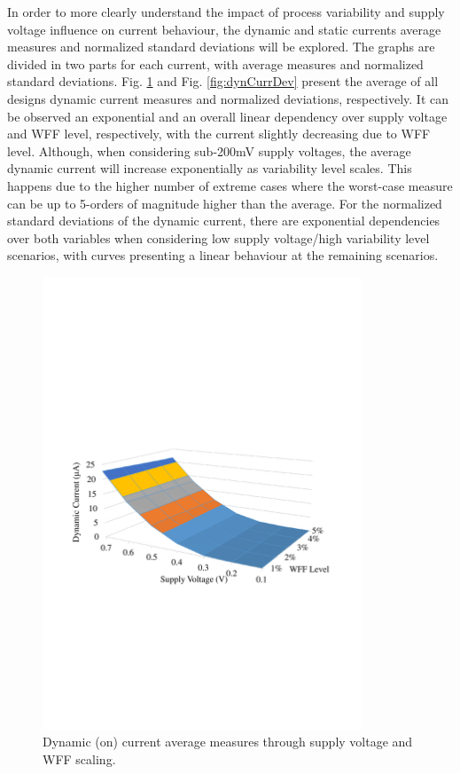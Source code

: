 \documentclass[pgmicro,diss,english]{iiufrgs}
\begin{document}
In order to more clearly understand the impact of process variability and supply voltage influence on current behaviour, the dynamic and static currents average measures and normalized standard deviations will be explored. The graphs are divided in two parts for each current, with average measures and normalized standard deviations. Fig. \ref{fig:dynCurrAbs} and Fig. \ref{fig:dynCurrDev} present the average of all designs dynamic current measures and normalized deviations, respectively. It can be observed an exponential and an overall linear dependency over supply voltage and WFF level, respectively, with the current slightly decreasing due to WFF level. Although, when considering sub-200mV supply voltages, the average dynamic current will increase exponentially as variability level scales. This happens due to the higher number of extreme cases where the worst-case measure can be up to 5-orders of magnitude higher than the average. For the normalized standard deviations of the dynamic current, there are exponential dependencies over both variables when considering low supply voltage/high variability level scenarios, with curves presenting a linear behaviour at the remaining scenarios.



    \begin{figure}[t]
        \centering
            \includegraphics[width=0.85\textwidth, trim={1.25cm 9cm 2cm 11cm}, clip]{dynamicCurrAbs.pdf}
            \caption{Dynamic (on) current average measures through supply voltage and WFF scaling.}
        \label{fig:dynCurrAbs}
    \end{figure}
\end{document}

